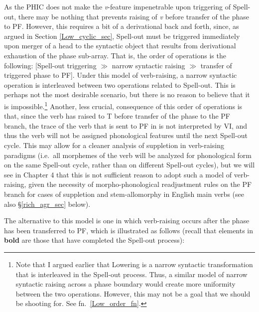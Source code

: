 As the PHIC does not make the {\it v}-feature impenetrable upon triggering of Spell-out, there may be nothing that prevents raising of {\it v} before transfer of the phase to PF. However, this requires a bit of a derivational back and forth, since, as argued in Section \ref{Low_cyclic_sec}, Spell-out must be triggered immediately upon merger of a head to the syntactic object that results from derivational exhaustion of the phase sub-array. That is, the order of operations is the following: [Spell-out triggering $\gg$ narrow syntactic raising $\gg$ transfer of triggered phase to PF]. Under this model of verb-raising, a narrow syntactic operation is interleaved between two operations related to Spell-out. This is perhaps not the most desirable scenario, but there is no reason to believe that it is impossible.\footnote{Note that I argued earlier that Lowering is a narrow syntactic transformation that is interleaved in the Spell-out process. Thus, a similar model of narrow syntactic raising across a phase boundary would create more uniformity between the two operations. However, this may not be a goal that we should be shooting for. See fn.\ \ref{Low_order_fn}.} Another, less crucial, consequence of this order of operations is that, since the verb has raised to T before transfer of the phase to the PF branch, the trace of the verb that is sent to PF in \Last[b] is not interpreted by VI, and thus the verb will not be assigned phonological features until the next Spell-out cycle. This may allow for a cleaner analysis of suppletion in verb-raising paradigms (i.e.\ all morphemes of the verb will be analyzed for phonological form on the same Spell-out cycle, rather than on different Spell-out cycles), but we will see in Chapter 4 that this is not sufficient reason to adopt such a model of verb-raising, given the necessity of morpho-phonological readjustment rules on the PF branch for cases of suppletion and stem-allomorphy in English main verbs (see also \S\ref{rich_agr_sec} below).

The alternative to this model is one in which verb-raising occurs after the phase has been transferred to PF, which is illustrated as follows (recall that elements in {\bf bold} are those that have completed the Spell-out process):

